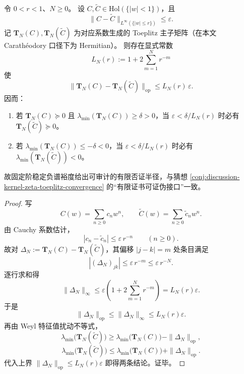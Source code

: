 \begin{theorem}\label{thm:xi-toeplitz-fixed-order-margin-perturbation-radius}
令 \(0<r<1\)、\(N\ge 0\)。
设 \(C,\widetilde C\in\mathrm{Hol}(\{|w|<1\})\)，且
\[
\|C-\widetilde C\|_{L^\infty(\{|w|\le r\})}\le \varepsilon.
\]
记 \(\mathbf T_N(C),\mathbf T_N(\widetilde C)\) 为对应系数生成的 Toeplitz 主子矩阵（在本文 Carath\'eodory 口径下为 Hermitian）。
则存在显式常数
\[
L_N(r):=1+2\sum_{m=1}^{N}r^{-m}
\]
使
\[
\|\mathbf T_N(C)-\mathbf T_N(\widetilde C)\|_{\mathrm{op}}
\le L_N(r)\,\varepsilon.
\]
因而：
\begin{enumerate}
  \item 若 \(\mathbf T_N(C)\succeq 0\) 且 \(\lambda_{\min}(\mathbf T_N(C))\ge \delta>0\)，当 \(\varepsilon<\delta/L_N(r)\) 时必有 \(\mathbf T_N(\widetilde C)\succeq 0\)。
  \item 若 \(\lambda_{\min}(\mathbf T_N(C))\le -\delta<0\)，当 \(\varepsilon<\delta/L_N(r)\) 时必有 \(\lambda_{\min}(\mathbf T_N(\widetilde C))<0\)。
\end{enumerate}
故固定阶稳定负谱裕度给出可审计的有限否证半径，与猜想 \ref{conj:discussion-kernel-zeta-toeplitz-convergence} 的“有限证书可证伪接口”一致。
\end{theorem}
\begin{proof}
写
\[
C(w)=\sum_{n\ge 0}c_n w^n,\qquad
\widetilde C(w)=\sum_{n\ge 0}\widetilde c_n w^n.
\]
由 Cauchy 系数估计，
\[
|c_n-\widetilde c_n|
\le \varepsilon\,r^{-n}\qquad(n\ge 0).
\]
故对 \(\Delta_N:=\mathbf T_N(C)-\mathbf T_N(\widetilde C)\)，其偏移 \(|j-k|=m\) 处条目满足
\[
|(\Delta_N)_{jk}|\le \varepsilon\,r^{-m}\le \varepsilon\,r^{-N}.
\]
逐行求和得
\[
\|\Delta_N\|_{\infty}
\le \varepsilon\!\left(1+2\sum_{m=1}^{N}r^{-m}\right)
=L_N(r)\varepsilon.
\]
于是
\[
\|\Delta_N\|_{\mathrm{op}}\le \|\Delta_N\|_{\infty}\le L_N(r)\varepsilon.
\]
再由 Weyl 特征值扰动不等式，
\[
\lambda_{\min}\!\bigl(\mathbf T_N(\widetilde C)\bigr)
\ge \lambda_{\min}\!\bigl(\mathbf T_N(C)\bigr)-\|\Delta_N\|_{\mathrm{op}},
\]
\[
\lambda_{\min}\!\bigl(\mathbf T_N(\widetilde C)\bigr)
\le \lambda_{\min}\!\bigl(\mathbf T_N(C)\bigr)+\|\Delta_N\|_{\mathrm{op}}.
\]
代入上界 \(\|\Delta_N\|_{\mathrm{op}}\le L_N(r)\varepsilon\) 即得两条结论。证毕。
\end{proof}

